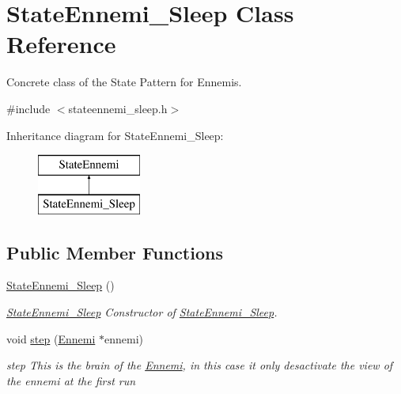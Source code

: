 \hypertarget{class_state_ennemi___sleep}{}\section{State\+Ennemi\+\_\+\+Sleep Class Reference}
\label{class_state_ennemi___sleep}


Concrete class of the State Pattern for Ennemis.  




{\ttfamily \#include $<$stateennemi\+\_\+sleep.\+h$>$}

Inheritance diagram for State\+Ennemi\+\_\+\+Sleep\+:\begin{figure}[H]
\begin{center}
\leavevmode
\includegraphics[height=2.000000cm]{class_state_ennemi___sleep}
\end{center}
\end{figure}
\subsection*{Public Member Functions}
\begin{DoxyCompactItemize}
\item 
\hypertarget{class_state_ennemi___sleep_ac39a77f604c8ea0162b9d399d0c41dd3}{}\hyperlink{class_state_ennemi___sleep_ac39a77f604c8ea0162b9d399d0c41dd3}{State\+Ennemi\+\_\+\+Sleep} ()\label{class_state_ennemi___sleep_ac39a77f604c8ea0162b9d399d0c41dd3}

\begin{DoxyCompactList}\small\item\em \hyperlink{class_state_ennemi___sleep}{State\+Ennemi\+\_\+\+Sleep} Constructor of \hyperlink{class_state_ennemi___sleep}{State\+Ennemi\+\_\+\+Sleep}. \end{DoxyCompactList}\item 
void \hyperlink{class_state_ennemi___sleep_a7c099adf160769dcd2c6829345241507}{step} (\hyperlink{class_ennemi}{Ennemi} $\ast$ennemi)
\begin{DoxyCompactList}\small\item\em step This is the brain of the \hyperlink{class_ennemi}{Ennemi}, in this case it only desactivate the view of the ennemi at the first run \end{DoxyCompactList}\end{DoxyCompactItemize}



